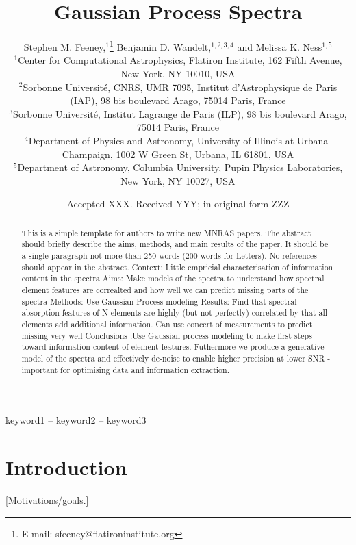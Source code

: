 \documentclass[a4paper,fleqn,usenatbib]{mnras}
\title[Gaussian Process Spectra]{Gaussian Process Spectra}
\author[S. M. Feeney et al.]{
Stephen M. Feeney,$^{1}$\thanks{E-mail: sfeeney@flatironinstitute.org}
Benjamin D. Wandelt,$^{1,2,3,4}$
and Melissa K. Ness$^{1,5}$
\\
$^{1}$Center for Computational Astrophysics, Flatiron Institute, 162 Fifth Avenue, New York, NY 10010, USA\\
$^{2}$Sorbonne Universit\'e, CNRS, UMR 7095,  Institut d'Astrophysique de Paris (IAP), 98 bis boulevard Arago, 75014 Paris, France\\
$^{3}$Sorbonne Universit\'e, Institut Lagrange de Paris (ILP), 98 bis boulevard Arago, 75014 Paris, France\\
$^{4}$Department of Physics and Astronomy, University of Illinois at Urbana-Champaign, 1002 W Green St, Urbana, IL 61801, USA\\
$^{5}$Department of Astronomy, Columbia University, Pupin Physics Laboratories, New York, NY 10027, USA
}
\date{Accepted XXX. Received YYY; in original form ZZZ}
\begin{document}
\label{firstpage}
\pagerange{\pageref{firstpage}--\pageref{lastpage}}
\maketitle

\begin{abstract}
This is a simple template for authors to write new MNRAS papers.
The abstract should briefly describe the aims, methods, and main results of the paper.
It should be a single paragraph not more than 250 words (200 words for Letters).
No references should appear in the abstract.
Context: Little empricial characterisation of information content in the spectra
Aims: Make models of the spectra to understand how spectral element features are correalted and how well we can predict missing parts of the spectra
Methods: Use Gaussian Process modeling
Results: Find that spectral absorption features of N elements are highly (but not perfectly) correlated by that all elements add additional information. Can use concert of measurements to predict missing very well
Conclusions :Use Gaussian process modeling to make first steps toward information content of element features. Futhermore we produce a generative model of the spectra and effectively de-noise to enable higher precision at lower SNR - important for optimising data and information extraction. 
\end{abstract}

\begin{keywords}
keyword1 -- keyword2 -- keyword3
\end{keywords}


\section{Introduction}

[Motivations/goals.] 
\end{document}
